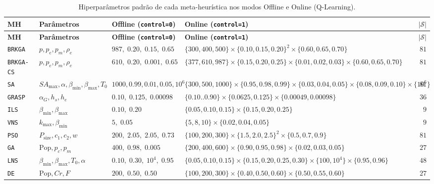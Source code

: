 \documentclass[11pt,a4paper]{article}
\begin{document}
\begin{small}
\begin{longtable}{@{}llp{4.3cm}p{5.5cm}r@{}}
\caption{Hiperparâmetros padrão de cada meta-heurística nos modos Offline e Online (Q-Learning).}
\label{tab:parametros}\\
\toprule
\textbf{MH} & \textbf{Parâmetros} & \textbf{Offline (\texttt{control=0})} & \textbf{Online (\texttt{control=1})} & $|\mathcal{S}|$ \\
\midrule
\endfirsthead
\toprule
\textbf{MH} & \textbf{Parâmetros} & \textbf{Offline (\texttt{control=0})} & \textbf{Online (\texttt{control=1})} & $|\mathcal{S}|$ \\
\midrule
\endhead
\bottomrule
\endfoot
\texttt{BRKGA} & $p, p_e, p_m, \rho_e$ & $987,\; 0.20,\; 0.15,\; 0.65$ & $\{300,400,500\}\times\{0.10,0.15,0.20\}^2\times\{0.60,0.65,0.70\}$ & $81$ \\
\texttt{BRKGA-CS} & $p, p_e, p_m, \rho_e$ & $610,\; 0.20,\; 0.001,\; 0.65$ & $\{377,610,987\}\times\{0.15,0.20,0.25\}\times\{0.01,0.02,0.03\}\times\{0.60,0.65,0.70\}$ & $81$ \\
\texttt{SA} & $SA_{\max}, \alpha, \beta_{\min}, \beta_{\max}, T_0$ & $1000, 0.99, 0.01, 0.05, 10^6$ & $\{300,500,1000\}\times\{0.95,0.98,0.99\}\times\{0.03,0.04,0.05\}\times\{0.08,0.09,0.10\}\times\{10^6\}$ & $81$ \\
\texttt{GRASP} & $\alpha_G, h_s, h_e$ & $0.10,\; 0.125,\; 0.00098$ & $\{0.10..0.90\}\times\{0.0625,0.125\}\times\{0.00049,0.00098\}$ & $36$ \\
\texttt{ILS} & $\beta_{\min}, \beta_{\max}$ & $0.10,\; 0.20$ & $\{0.05,0.10,0.15\}\times\{0.15,0.20,0.25\}$ & $9$ \\
\texttt{VNS} & $k_{\max}, \beta_{\min}$ & $5,\; 0.05$ & $\{5,8,10\}\times\{0.02,0.04,0.05\}$ & $9$ \\
\texttt{PSO} & $P_{\text{size}}, c_1, c_2, w$ & $200,\; 2.05,\; 2.05,\; 0.73$ & $\{100,200,300\}\times\{1.5,2.0,2.5\}^2\times\{0.5,0.7,0.9\}$ & $81$ \\
\texttt{GA} & $\text{Pop}, p_c, p_m$ & $400,\; 0.98,\; 0.005$ & $\{200,400,600\}\times\{0.90,0.95,0.98\}\times\{0.02,0.03,0.05\}$ & $27$ \\
\texttt{LNS} & $\beta_{\min}, \beta_{\max}, T_0, \alpha$ & $0.10,\; 0.30,\; 10^4,\; 0.95$ & $\{0.05,0.10,0.15\}\times\{0.15,0.20,0.25,0.30\}\times\{100,10^4\}\times\{0.95,0.96\}$ & $48$ \\
\texttt{DE} & $\text{Pop}, Cr, F$ & $200,\; 0.50,\; 0.50$ & $\{100,200,300\}\times\{0.40,0.50,0.60\}\times\{0.50,0.55,0.60\}$ & $27$ \\

\end{longtable}
\end{small}
\end{document}
